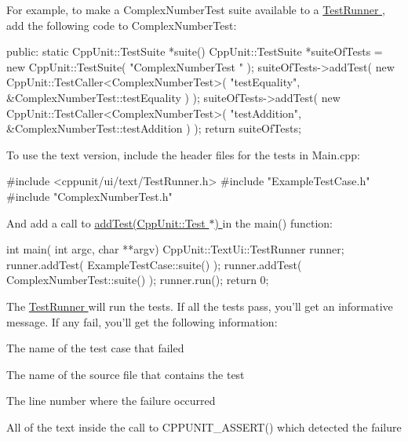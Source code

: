 For example, to make a ComplexNumberTest suite available to a \hyperlink{group___executing_test}{TestRunner }, add the following code to ComplexNumberTest:


\begin{DoxyCode}
public: 
  static CppUnit::TestSuite *suite()
  {
    CppUnit::TestSuite *suiteOfTests = new CppUnit::TestSuite( "ComplexNumberTest
      " );
    suiteOfTests->addTest( new CppUnit::TestCaller<ComplexNumberTest>( 
                                   "testEquality", 
                                   &ComplexNumberTest::testEquality ) );
    suiteOfTests->addTest( new CppUnit::TestCaller<ComplexNumberTest>(
                                   "testAddition",
                                   &ComplexNumberTest::testAddition ) );
    return suiteOfTests;
  }
\end{DoxyCode}


\label{cppunit_cookbook_test_runner_code}
\hypertarget{cppunit_cookbook_test_runner_code}{}
 To use the text version, include the header files for the tests in Main.cpp:


\begin{DoxyCode}
#include <cppunit/ui/text/TestRunner.h>
#include "ExampleTestCase.h"
#include "ComplexNumberTest.h"
\end{DoxyCode}


And add a call to \hyperlink{}{addTest(CppUnit::Test $\ast$) } in the {\ttfamily main()} function:


\begin{DoxyCode}
int main( int argc, char **argv)
{
  CppUnit::TextUi::TestRunner runner;
  runner.addTest( ExampleTestCase::suite() );
  runner.addTest( ComplexNumberTest::suite() );
  runner.run();
  return 0;
}
\end{DoxyCode}


The \hyperlink{group___executing_test}{TestRunner } will run the tests. If all the tests pass, you'll get an informative message. If any fail, you'll get the following information:


\begin{DoxyItemize}
\item The name of the test case that failed
\item The name of the source file that contains the test
\item The line number where the failure occurred
\item All of the text inside the call to CPPUNIT\_\-ASSERT() which detected the failure
\end{DoxyItemize}

